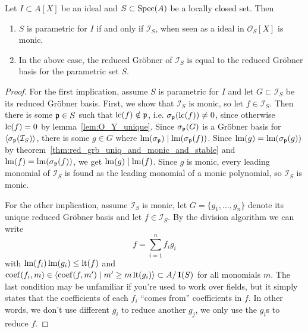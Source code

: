 \begin{theorem}\label{thm:para_iff_I_S_monic}
  Let $I \subset A[X]$ be an ideal and $S \subset \operatorname{Spec}(A)$ be a locally closed set. Then
  \begin{enumerate}
    \item $S$ is parametric for $I$ if and only if $\mathcal I_{S}$, when seen as a ideal in $\mathcal O_{S}[X]$ is monic.
    \item In the above case, the reduced Gröbner of $\mathcal I_{S}$ is equal to the reduced Gröbner basis for the parametric set $S$.
  \end{enumerate}
\end{theorem}
\begin{proof}
  For the first implication, assume $S$ is parametric for $I$ and let $G \subset \mathcal I_{S}$ be its reduced Gröbner basis. First, we show that $\mathcal I_{S}$ is monic, so let $f \in \mathcal I_{S}$. Then there is some $\mathfrak p \in S$ such that $\operatorname{lc}(f) \notin \mathfrak p$, i.e. $\sigma_{\mathfrak p}(\operatorname{lc}(f)) \neq 0$, since otherwise $\operatorname{lc}(f) = 0$ by lemma~\ref{lem:O_Y_unique}. Since $\sigma_{\mathfrak p}(G)$ is a Gröbner basis for $\langle \sigma_{\mathfrak p}(\mathcal I_{S}) \rangle$, there is some $g \in G$ where $\operatorname{lm}(\sigma_{\mathfrak p}) \mid \operatorname{lm}(\sigma_{\mathfrak p}(f))$. Since $\operatorname{lm}(g) = \operatorname{lm}(\sigma_{\mathfrak p}(g))$ by theorem~\ref{thm:red_grb_uniq_and_monic_and_stable} and $\operatorname{lm}(f) = \operatorname{lm}(\sigma_{\mathfrak p}(f))$, we get $\operatorname{lm}(g) \mid \operatorname{lm}(f)$. Since $g$ is monic, every leading monomial of $\mathcal I_{S}$ is found as the leading monomial of a monic polynomial, so $\mathcal I_{S}$ is monic.

  For the other implication, assume $\mathcal I_{S}$ is monic, let $G = \{g_{1}, \dots, g_{n}\}$ denote its unique reduced Gröbner basis and let $f \in \mathcal I_{S}$. By the division algorithm we can write
  \[f = \sum_{i=1}^{n} f_{i} g_{i}\]
  with $\operatorname{lm}(f_{i})\operatorname{lm}(g_{i}) \leq \operatorname{lt}(f)$ and $\operatorname{coef}(f_{i}, m) \in \langle \operatorname{coef}(f, m') \mid m' \geq m \operatorname{lt}(g_{i}) \rangle \subset A/\operatorname{\mathbf I}(S)$ for all monomials $m$. The last condition may be unfamiliar if you're used to work over fields, but it simply states that the coefficients of each $f_{i}$ ``comes from'' coefficients in $f$. In other words, we don't use different $g_{i}$ to reduce another $g_{j}$, we only use the $g_{i}$s to reduce $f$.


\end{proof}
